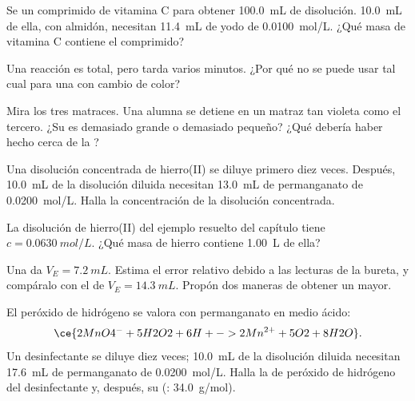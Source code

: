 \begin{exercise}[$\star\star$]\label{exo:g11:titration:7}
Se  un comprimido de vitamina C para obtener \qty{100.0}{mL} de
disolución. \qty{10.0}{mL} de ella, con almidón, necesitan
\qty{11.4}{mL} de yodo de \qty{0.0100}{mol/L}. ¿Qué masa de vitamina C
contiene el comprimido?
\end{exercise}

\begin{exercise}[$\star\star$]\label{exo:g11:titration:8}
Una reacción es total, pero tarda varios minutos. ¿Por qué no se puede
usar tal cual para una  con cambio de color?
\end{exercise}

\begin{exercise}[$\star\star$]\label{exo:g11:titration:9}
Mira los tres matraces. Una alumna se detiene en un matraz tan violeta
como el tercero. ¿Su  es demasiado grande o
demasiado pequeño? ¿Qué debería haber hecho cerca de la ?
\end{exercise}

\begin{exercise}[$\star\star$]\label{exo:g11:titration:10}
Una disolución concentrada de hierro(II) se diluye primero diez veces.
Después, \qty{10.0}{mL} de la disolución diluida necesitan
\qty{13.0}{mL} de permanganato de \qty{0.0200}{mol/L}. Halla la
concentración de la disolución concentrada.
\end{exercise}

\begin{exercise}[$\star\star$]\label{exo:g11:titration:11}
La disolución de hierro(II) del ejemplo resuelto del capítulo tiene
$c = \qty{0.0630}{mol/L}$. ¿Qué masa de hierro contiene \qty{1.00}{L} de
ella?
\end{exercise}

\begin{exercise}[$\star\star\star$]\label{exo:g11:titration:12}
Una  da $V_E = \qty{7.2}{mL}$. Estima el error relativo debido
a las lecturas de la bureta, y compáralo con el de $V_E = \qty{14.3}{mL}$.
Propón dos maneras de obtener un  mayor.
\end{exercise}

\begin{exercise}[$\star\star\star$]\label{exo:g11:titration:13}
El peróxido de hidrógeno se valora con permanganato en medio ácido:
\[
  \ce{2MnO4^- + 5H2O2 + 6H+ -> 2Mn^{2+} + 5O2 + 8H2O} .
\]
Un desinfectante se diluye diez veces; \qty{10.0}{mL} de la disolución
diluida necesitan \qty{17.6}{mL} de permanganato de \qty{0.0200}{mol/L}.
Halla la  de peróxido de hidrógeno del desinfectante
y, después, su  (: \qty{34.0}{g/mol}).
\end{exercise}

